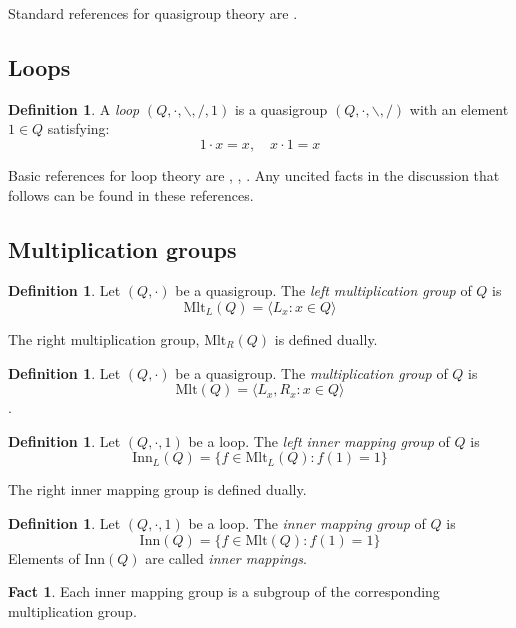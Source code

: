 \documentclass[12pt, twoside, openright]{report}
\theoremstyle{definition}
\newtheorem{fct}[thm]{Fact}
\newtheorem{dfn}[thm]{Definition}
\newcommand{\ldv}{\backslash}       %
\newcommand{\rdv}{/}                %
\newcommand{\mlt}{\text{Mlt}}       %
\newcommand{\inn}{\text{Inn}}       %
\begin{document}
Standard references for quasigroup theory are \cite{Belousov,Bruck,Pf,Shcherbacov,Smith}.

\subsection{Loops}

\begin{dfn}
  A \emph{loop} $(Q, \cdot, \ldv, \rdv, 1)$ is a quasigroup $(Q, \cdot, \ldv, \rdv)$ with an element $1\in Q$ satisfying:
  \[1\cdot x = x, \quad x\cdot 1 = x\]
\end{dfn}

Basic references for loop theory are \cite{Bel}, \cite{Bruck}, \cite{Pf}. Any uncited facts in the discussion that follows
  can be found in these references.

\subsection{Multiplication groups}

\begin{dfn}
  Let $(Q, \cdot)$ be a quasigroup. The \emph{left multiplication group} of $Q$ is
  \[\mlt_L(Q) = \langle L_x : x\in Q\rangle\]
\end{dfn}

The right multiplication group, $\mlt_R(Q)$ is defined dually.

\begin{dfn}
  Let $(Q, \cdot)$ be a quasigroup. The \emph{multiplication group} of $Q$ is
  \[\mlt(Q) = \langle L_x, R_x : x\in Q\rangle\].
\end{dfn}

\begin{dfn}
  Let $(Q, \cdot, 1)$ be a loop. The \emph{left inner mapping group} of $Q$ is
  \[\inn_L(Q) = \{f\in \mlt_L(Q) : f(1) = 1\}\]
\end{dfn}

The right inner mapping group is defined dually.

\begin{dfn}
  Let $(Q, \cdot, 1)$ be a loop. The \emph{inner mapping group} of $Q$ is
  \[\inn(Q) = \{f\in\mlt(Q) : f(1) = 1\}\]
  Elements of $\inn(Q)$ are called \emph{inner mappings}.
\end{dfn}

\begin{fct}
  Each inner mapping group is a subgroup of the corresponding multiplication group.
\end{fct}
\end{document}

